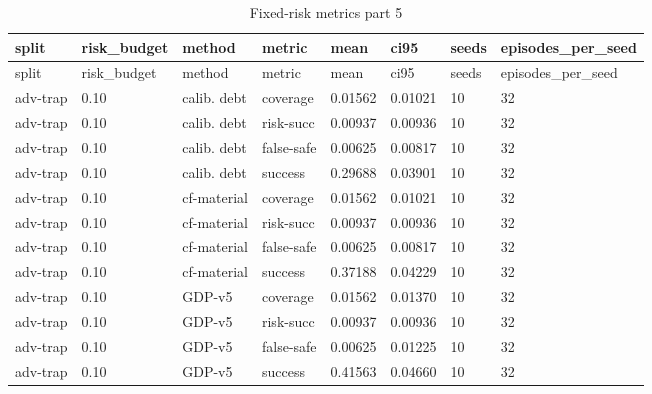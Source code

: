 \documentclass{article}
\begin{document}
\begin{center}
\tiny
\renewcommand{\arraystretch}{0.92}
\setlength{\tabcolsep}{3pt}
\begin{longtable}{llllllll}
\caption{Fixed-risk metrics part 5}\label{tab:fixed-risk-metrics-5}\\
\toprule
split & risk\_budget & method & metric & mean & ci95 & seeds & episodes\_per\_seed \\
\midrule
\endfirsthead
\toprule
split & risk\_budget & method & metric & mean & ci95 & seeds & episodes\_per\_seed \\
\midrule
\endhead
adv-trap & 0.10 & calib. debt & coverage & 0.01562 & 0.01021 & 10 & 32 \\
adv-trap & 0.10 & calib. debt & risk-succ & 0.00937 & 0.00936 & 10 & 32 \\
adv-trap & 0.10 & calib. debt & false-safe & 0.00625 & 0.00817 & 10 & 32 \\
adv-trap & 0.10 & calib. debt & success & 0.29688 & 0.03901 & 10 & 32 \\
adv-trap & 0.10 & cf-material & coverage & 0.01562 & 0.01021 & 10 & 32 \\
adv-trap & 0.10 & cf-material & risk-succ & 0.00937 & 0.00936 & 10 & 32 \\
adv-trap & 0.10 & cf-material & false-safe & 0.00625 & 0.00817 & 10 & 32 \\
adv-trap & 0.10 & cf-material & success & 0.37188 & 0.04229 & 10 & 32 \\
adv-trap & 0.10 & GDP-v5 & coverage & 0.01562 & 0.01370 & 10 & 32 \\
adv-trap & 0.10 & GDP-v5 & risk-succ & 0.00937 & 0.00936 & 10 & 32 \\
adv-trap & 0.10 & GDP-v5 & false-safe & 0.00625 & 0.01225 & 10 & 32 \\
adv-trap & 0.10 & GDP-v5 & success & 0.41563 & 0.04660 & 10 & 32 \\
\bottomrule
\end{longtable}
\renewcommand{\arraystretch}{1.0}
\end{center}
\end{document}
